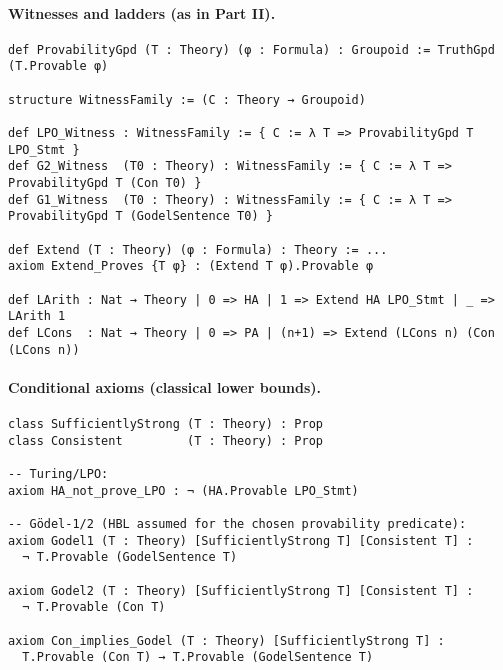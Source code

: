 \documentclass[11pt]{article}
\theoremstyle{definition}
\theoremstyle{remark}
\begin{document}
\paragraph{Witnesses and ladders (as in Part II).}
\begin{verbatim}
def ProvabilityGpd (T : Theory) (φ : Formula) : Groupoid := TruthGpd (T.Provable φ)

structure WitnessFamily := (C : Theory → Groupoid)

def LPO_Witness : WitnessFamily := { C := λ T => ProvabilityGpd T LPO_Stmt }
def G2_Witness  (T0 : Theory) : WitnessFamily := { C := λ T => ProvabilityGpd T (Con T0) }
def G1_Witness  (T0 : Theory) : WitnessFamily := { C := λ T => ProvabilityGpd T (GodelSentence T0) }

def Extend (T : Theory) (φ : Formula) : Theory := ...
axiom Extend_Proves {T φ} : (Extend T φ).Provable φ

def LArith : Nat → Theory | 0 => HA | 1 => Extend HA LPO_Stmt | _ => LArith 1
def LCons  : Nat → Theory | 0 => PA | (n+1) => Extend (LCons n) (Con (LCons n))
\end{verbatim}

\paragraph{Conditional axioms (classical lower bounds).}
\begin{verbatim}
class SufficientlyStrong (T : Theory) : Prop
class Consistent         (T : Theory) : Prop

-- Turing/LPO:
axiom HA_not_prove_LPO : ¬ (HA.Provable LPO_Stmt)

-- Gödel-1/2 (HBL assumed for the chosen provability predicate):
axiom Godel1 (T : Theory) [SufficientlyStrong T] [Consistent T] :
  ¬ T.Provable (GodelSentence T)

axiom Godel2 (T : Theory) [SufficientlyStrong T] [Consistent T] :
  ¬ T.Provable (Con T)

axiom Con_implies_Godel (T : Theory) [SufficientlyStrong T] :
  T.Provable (Con T) → T.Provable (GodelSentence T)
\end{verbatim}
\end{document}
